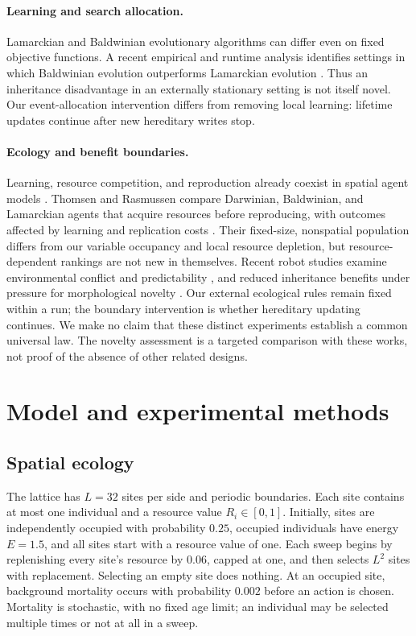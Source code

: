 \documentclass[11pt]{article}
\begin{document}
\paragraph{Learning and search allocation.}
Lamarckian and Baldwinian evolutionary algorithms can differ even on fixed objective functions. A recent empirical and runtime analysis identifies settings in which Baldwinian evolution outperforms Lamarckian evolution \cite{benito2026}. Thus an inheritance disadvantage in an externally stationary setting is not itself novel. Our event-allocation intervention differs from removing local learning: lifetime updates continue after new hereditary writes stop.

\paragraph{Ecology and benefit boundaries.}
Learning, resource competition, and reproduction already coexist in spatial agent models \cite{aguilar2019}. Thomsen and Rasmussen compare Darwinian, Baldwinian, and Lamarckian agents that acquire resources before reproducing, with outcomes affected by learning and replication costs \cite{thomsen2023}. Their fixed-size, nonspatial population differs from our variable occupancy and local resource depletion, but resource-dependent rankings are not new in themselves. Recent robot studies examine environmental conflict and predictability \cite{debruinDynamic}, and reduced inheritance benefits under pressure for morphological novelty \cite{muff2026}. Our external ecological rules remain fixed within a run; the boundary intervention is whether hereditary updating continues. We make no claim that these distinct experiments establish a common universal law. The novelty assessment is a targeted comparison with these works, not proof of the absence of other related designs.

\section{Model and experimental methods}
\subsection{Spatial ecology}
The lattice has $L=32$ sites per side and periodic boundaries. Each site contains at most one individual and a resource value $R_i\in[0,1]$. Initially, sites are independently occupied with probability $0.25$, occupied individuals have energy $E=1.5$, and all sites start with a resource value of one. Each sweep begins by replenishing every site's resource by $0.06$, capped at one, and then selects $L^2$ sites with replacement. Selecting an empty site does nothing. At an occupied site, background mortality occurs with probability $0.002$ before an action is chosen. Mortality is stochastic, with no fixed age limit; an individual may be selected multiple times or not at all in a sweep.
\end{document}
